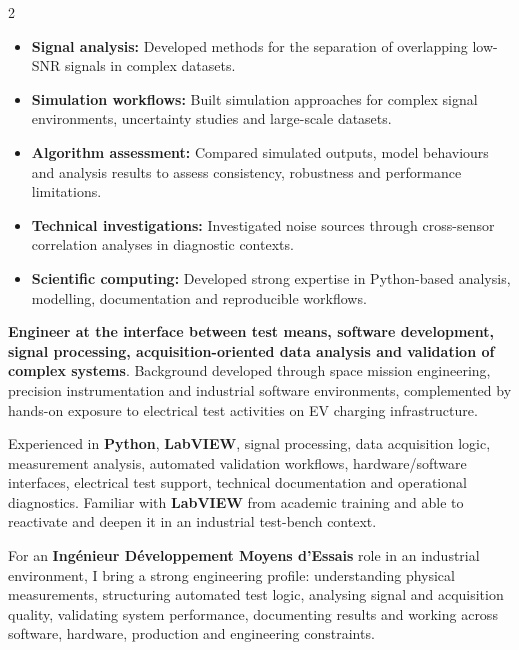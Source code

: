 \documentclass[8pt,a4paper,ragged2e,withhyper]{altacv}
\begin{document}
\begin{paracol}{2}
\begin{itemize}
  \item \textbf{Signal analysis:} Developed methods for the separation of overlapping low-SNR signals in complex datasets.
  \item \textbf{Simulation workflows:} Built simulation approaches for complex signal environments, uncertainty studies and large-scale datasets.
  \item \textbf{Algorithm assessment:} Compared simulated outputs, model behaviours and analysis results to assess consistency, robustness and performance limitations.
  \item \textbf{Technical investigations:} Investigated noise sources through cross-sensor correlation analyses in diagnostic contexts.
  \item \textbf{Scientific computing:} Developed strong expertise in Python-based analysis, modelling, documentation and reproducible workflows.
\end{itemize}

\switchcolumn


\textbf{Engineer at the interface between test means, software development, signal processing, acquisition-oriented data analysis and validation of complex systems}. Background developed through space mission engineering, precision instrumentation and industrial software environments, complemented by hands-on exposure to electrical test activities on EV charging infrastructure.

Experienced in \textbf{Python}, \textbf{LabVIEW}, signal processing, data acquisition logic, measurement analysis, automated validation workflows, hardware/software interfaces, electrical test support, technical documentation and operational diagnostics. Familiar with \textbf{LabVIEW} from academic training and able to reactivate and deepen it in an industrial test-bench context.

For an \textbf{Ingénieur Développement Moyens d'Essais} role in an industrial environment, I bring a strong engineering profile: understanding physical measurements, structuring automated test logic, analysing signal and acquisition quality, validating system performance, documenting results and working across software, hardware, production and engineering constraints.



\end{paracol}
\end{document}

